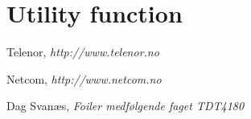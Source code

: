 \documentclass[titlepage]{article}
\begin{document}
\newpage

\section{Utility function}


\begin{thebibliography}{9}

	Telenor,
	\emph{http://www.telenor.no}

	Netcom,
	\emph{http://www.netcom.no}

	Dag Svanæs,
	\emph{Foiler medfølgende faget TDT4180}
\end{thebibliography}
\end{document}
